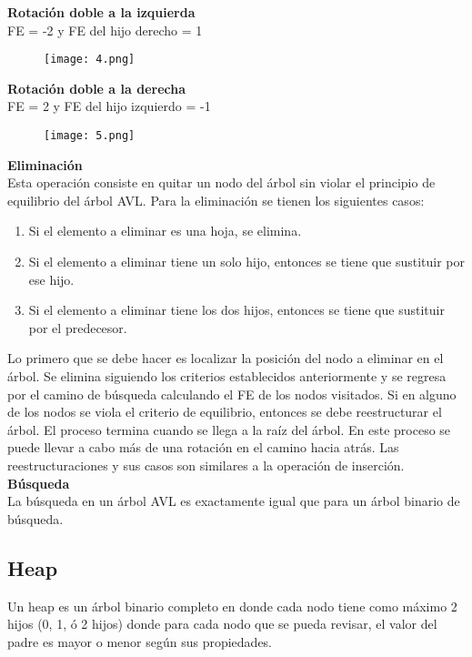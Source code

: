 \documentclass{article}
\begin{document}
\textbf{Rotación doble  a la izquierda}\\

FE = -2 y  FE del hijo derecho = 1
\begin{figure}[ht]
\centering
\texttt{[image: 4.png]}
\end{figure}
\newpage
\textbf{Rotación doble a la derecha}\\

FE = 2 y  FE del hijo izquierdo = -1
\begin{figure}[ht]
\centering
\texttt{[image: 5.png]}
\end{figure}

\textbf{Eliminación}\\

Esta operación consiste en quitar un nodo del árbol sin violar el principio de equilibrio del árbol AVL.
Para la eliminación se tienen los siguientes casos:
\begin{enumerate}
\item Si el elemento a eliminar es una hoja, se elimina.
\item Si el elemento a eliminar tiene un solo hijo, entonces se tiene que sustituir por ese hijo.
\item Si el elemento a eliminar tiene los dos hijos, entonces se tiene que sustituir por el predecesor.
\end{enumerate}

Lo primero que se debe hacer es localizar la posición del nodo a eliminar en el árbol. Se elimina siguiendo los criterios establecidos anteriormente y se regresa por el camino de búsqueda calculando el FE de los nodos visitados. Si en alguno de los nodos se viola el criterio de equilibrio, entonces se debe reestructurar el árbol. El proceso termina cuando se llega a la raíz del árbol. En este proceso se puede llevar a cabo más de una rotación en el camino hacia atrás.
Las reestructuraciones y sus casos son similares a la operación de inserción.\\

\textbf{Búsqueda}\\
La búsqueda en un árbol AVL es exactamente igual que para un árbol binario de búsqueda.
\newpage
\subsection{Heap}

Un heap es un árbol binario completo en donde cada nodo tiene como máximo 2 hijos (0, 1, ó 2 hijos) donde para cada nodo que se pueda revisar, el valor del padre es mayor o menor según sus propiedades.\\
\end{document}
